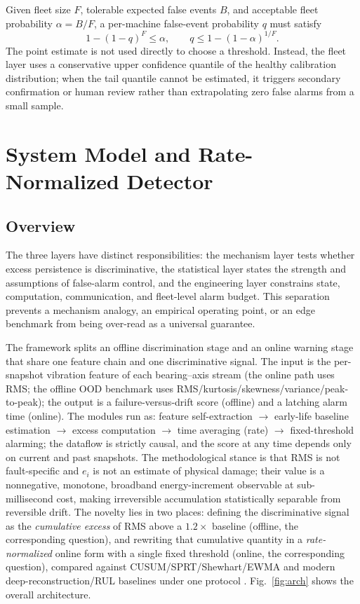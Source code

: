 \documentclass[journal]{IEEEtran}
\begin{document}
Given fleet size $F$, tolerable expected false events $B$, and acceptable fleet probability $\alpha=B/F$, a per-machine false-event probability $q$ must satisfy
\begin{equation}
1-(1-q)^F\le\alpha,\qquad q\le1-(1-\alpha)^{1/F}.
\end{equation}
The point estimate is not used directly to choose a threshold. Instead, the fleet layer uses a conservative upper confidence quantile of the healthy calibration distribution; when the tail quantile cannot be estimated, it triggers secondary confirmation or human review rather than extrapolating zero false alarms from a small sample.

\section{System Model and Rate-Normalized Detector}\label{sec:method}

\subsection{Overview}
The three layers have distinct responsibilities: the mechanism layer tests whether excess persistence is discriminative, the statistical layer states the strength and assumptions of false-alarm control, and the engineering layer constrains state, computation, communication, and fleet-level alarm budget. This separation prevents a mechanism analogy, an empirical operating point, or an edge benchmark from being over-read as a universal guarantee.

The framework splits an offline discrimination stage and an online warning stage that share one feature chain and one discriminative signal. The input is the per-snapshot vibration feature of each bearing--axis stream (the online path uses RMS; the offline OOD benchmark uses RMS/kurtosis/skewness/variance/peak-to-peak); the output is a failure-versus-drift score (offline) and a latching alarm time (online). The modules run as: feature self-extraction $\to$ early-life baseline estimation $\to$ excess computation $\to$ time averaging (rate) $\to$ fixed-threshold alarming; the dataflow is strictly causal, and the score at any time depends only on current and past snapshots. The methodological stance is that RMS is not fault-specific and $e_i$ is not an estimate of physical damage; their value is a nonnegative, monotone, broadband energy-increment observable at sub-millisecond cost, making irreversible accumulation statistically separable from reversible drift. The novelty lies in two places: defining the discriminative signal as the \emph{cumulative excess} of RMS above a $1.2\times$ baseline (offline, the corresponding question), and rewriting that cumulative quantity in a \emph{rate-normalized} online form with a single fixed threshold (online, the corresponding question), compared against CUSUM/SPRT/Shewhart/EWMA and modern deep-reconstruction/RUL baselines under one protocol . Fig.~\ref{fig:arch} shows the overall architecture.
\end{document}
